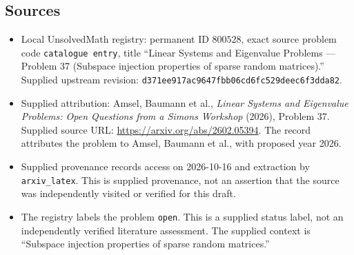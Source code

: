 \documentclass[11pt]{article}
\begin{document}
\subsection{Sources}
\begin{itemize}
\item Local UnsolvedMath registry: permanent ID \(800528\), exact source problem code \texttt{catalogue entry}, title ``Linear Systems and Eigenvalue Problems --- Problem 37 (Subspace injection properties of sparse random matrices).'' Supplied upstream revision: \texttt{d371ee917ac9647fbb06cd6fc529deec6f3dda82}.
\item Supplied attribution: Amsel, Baumann et al., \emph{Linear Systems and Eigenvalue Problems: Open Questions from a Simons Workshop} (2026), Problem 37. Supplied source URL: \url{https://arxiv.org/abs/2602.05394}. The record attributes the problem to Amsel, Baumann et al., with proposed year 2026.
\item Supplied provenance records access on 2026-10-16 and extraction by \texttt{arxiv\_latex}. This is supplied provenance, not an assertion that the source was independently visited or verified for this draft.
\item The registry labels the problem \texttt{open}. This is a supplied status label, not an independently verified literature assessment. The supplied context is ``Subspace injection properties of sparse random matrices.''
\end{itemize}
\end{document}
